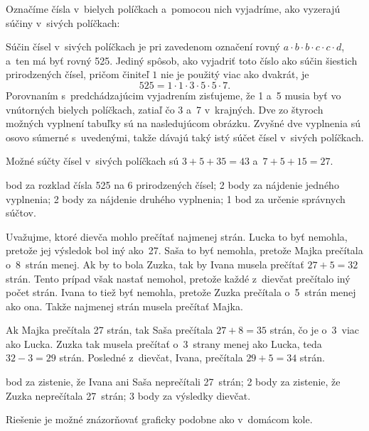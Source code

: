 {%
Označíme čísla v~bielych políčkach a~pomocou nich vyjadríme, ako vyzerajú
súčiny v~sivých políčkach:
%

Súčin čísel v~sivých políčkach je pri zavedenom označení rovný
$a\cdot b\cdot b\cdot c\cdot c\cdot d$, a~ten má byť rovný 525.
Jediný spôsob, ako vyjadriť toto číslo ako súčin šiestich prirodzených čísel, pričom činiteľ $1$ nie je použitý viac ako dvakrát, je
$$
525=1\cdot1\cdot3\cdot5\cdot5\cdot7.
$$
Porovnaním s~predchádzajúcim vyjadrením zisťujeme, že 1 a~5 musia byť vo
vnútorných bielych políčkach, zatiaľ čo 3 a~7 v~krajných.
Dve zo štyroch možných vyplnení tabuľky sú na nasledujúcom obrázku.
Zvyšné dve vyplnenia sú osovo súmerné s~uvedenými, takže dávajú taký istý
súčet čísel v~sivých políčkach.
%

Možné súčty čísel v~sivých políčkach sú $3+5+35=43$ a~$7+5+15=27$.

 bod za rozklad čísla 525 na 6 prirodzených čísel;
2 body za nájdenie jedného vyplnenia;
2 body za nájdenie druhého vyplnenia;
1 bod za určenie správnych súčtov.
\endhodnotenie
}

{%
Uvažujme, ktoré dievča mohlo prečítať najmenej strán.
Lucka to byť nemohla, pretože jej výsledok bol iný ako~27.
Saša to byť nemohla, pretože Majka prečítala o~8~strán menej.
Ak by to bola Zuzka, tak by Ivana musela prečítať $27+5=32$ strán.
Tento prípad však nastať nemohol, pretože každé z~dievčat prečítalo iný počet strán.
Ivana to tiež byť nemohla, pretože Zuzka prečítala o~5~strán menej ako ona.
Takže najmenej strán musela prečítať Majka.

Ak Majka prečítala 27 strán, tak Saša prečítala $27+8=35$ strán,
čo je o~3~viac ako Lucka. Zuzka tak musela prečítať o~3~strany menej
ako Lucka, teda $32-3=29$ strán. Posledné z~dievčat, Ivana, prečítala
$29+5=34$ strán.

 bod za zistenie, že Ivana ani Saša neprečítali 27~strán;
2 body za zistenie, že Zuzka neprečítala 27~strán;
3 body za výsledky dievčat.

\poznamka Riešenie je možné znázorňovať graficky podobne ako v~domácom kole.
\endhodnotenie
}

